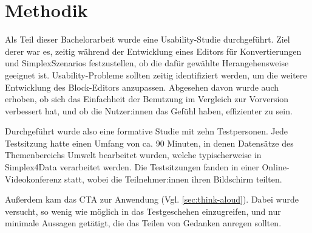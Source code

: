 \section{Methodik}

Als Teil dieser Bachelorarbeit wurde eine Usability-Studie durchgeführt. Ziel derer war es, zeitig während der Entwicklung eines Editors für Konvertierungen und SimplexSzenarios festzustellen, ob die dafür gewählte Herangehensweise geeignet ist. Usability-Probleme sollten zeitig identifiziert werden, um die weitere Entwicklung des Block-Editors anzupassen. Abgesehen davon wurde auch erhoben, ob sich das Einfachheit der Benutzung im Vergleich zur Vorversion verbessert hat, und ob die Nutzer:innen das Gefühl haben, effizienter zu sein.

Durchgeführt wurde also eine formative Studie mit zehn Testpersonen. Jede Testsitzung hatte einen Umfang von ca. 90 Minuten, in denen Datensätze des Themenbereichs Umwelt bearbeitet wurden, welche typischerweise in Simplex4Data verarbeitet werden. Die Testsitzungen fanden in einer Online-Videokonferenz statt, wobei die Teilnehmer:innen ihren Bildschirm teilten.

Außerdem kam das \acf{CTA} zur Anwendung (Vgl. \ref{sec:think-aloud}). Dabei wurde versucht, so wenig wie möglich in das Testgeschehen einzugreifen, und nur minimale Aussagen getätigt, die das Teilen von Gedanken anregen sollten.
